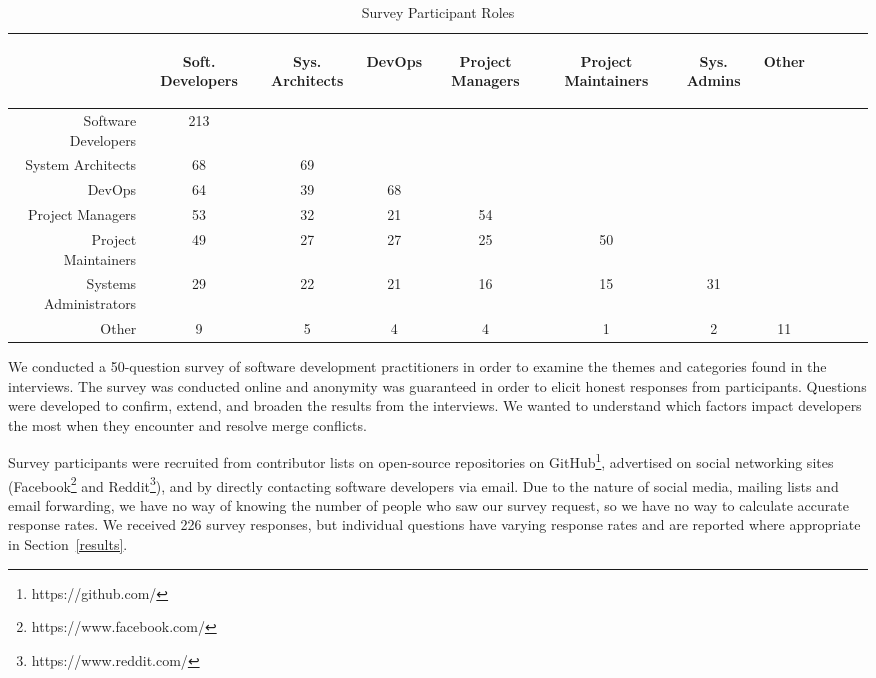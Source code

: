 \begin{table}[!]
\renewcommand{\arraystretch}{1.3}
\caption{Survey Participant Roles}
\label{survey_roles}
\centering
\begin{tabularx}{0.45\textwidth}{@{}r|*{10}{C}c@{}}
\toprule
\addlinespace[5.4em]
	& \begin{rotate}{45} Soft. Developers \end{rotate} 
	& \begin{rotate}{45} Sys. Architects \end{rotate} 
	& \begin{rotate}{45} DevOps \end{rotate} 
	& \begin{rotate}{45} Project Managers \end{rotate}
	& \begin{rotate}{45} Project Maintainers \end{rotate}
	& \begin{rotate}{45} Sys. Admins \end{rotate}
	& \begin{rotate}{45} Other \end{rotate}\\
\midrule
	Software Developers & 213 & & & & & & \\
	System Architects & 68 & 69 & & & & & \\
	DevOps & 64 & 39 & 68 & & & & \\
	Project Managers & 53 & 32 & 21 & 54 & & & \\
	Project Maintainers & 49 & 27 & 27 & 25 & 50 & & \\
	Systems Administrators & 29 & 22 & 21 & 16 & 15 & 31 & \\
	Other & 9 & 5 & 4 & 4 & 1 & 2 & 11 \\
\bottomrule
\end{tabularx}
\end{table}

We conducted a 50-question survey of software development practitioners in order to examine the themes and categories found in the interviews.
The survey was conducted online and anonymity was guaranteed in order to elicit honest responses from participants.
Questions were developed to confirm, extend, and broaden the results from the interviews.
We wanted to understand which factors impact developers the most when they encounter and resolve merge conflicts.

Survey participants were recruited from contributor lists on open-source repositories on GitHub\footnote{https://github.com/}, advertised on social networking sites (Facebook\footnote{https://www.facebook.com/} and Reddit\footnote{https://www.reddit.com/}), and by directly contacting software developers via email. Due to the nature of social media, mailing lists and email forwarding, we have no way of knowing the number of people who saw our survey request, so we have no way to calculate accurate response rates.
We received 226 survey responses, but individual questions have varying response rates and are reported where appropriate in Section~\ref{results}.

